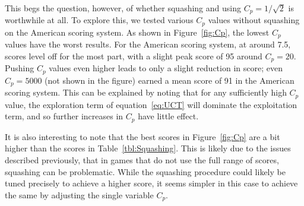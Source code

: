 \documentclass[letterpaper]{article}
\begin{document}

This begs the question, however, of whether squashing and using $C_p = 1 / \sqrt{2}$ is worthwhile at all. To explore this, we tested various $C_p$ values without squashing on the American scoring system. As shown in Figure~\ref{fig:Cp}, the lowest $C_p$ values have the worst results. For the American scoring system, at around 7.5, scores level off for the most part, with a slight peak score of 95 around $C_p = 20$. Pushing $C_p$ values even higher leads to only a slight reduction in score; even $C_p = 5000$ (not shown in the figure) earned a mean score of 91 in the American scoring system. This can be explained by noting that for any sufficiently high $C_p$ value, the exploration term of equation~\ref{eq:UCT} will dominate the exploitation term, and so further increases in $C_p$ have little effect.

It is also interesting to note that the best scores in Figure~\ref{fig:Cp} are a bit higher than the scores in Table~\ref{tbl:Squashing}. This is likely due to the issues described previously, that in games that do not use the full range of scores, squashing can be problematic. While the squashing procedure could likely be tuned precisely to achieve a higher score, it seems simpler in this case to achieve the same by adjusting the single variable $C_p$.
\end{document}
